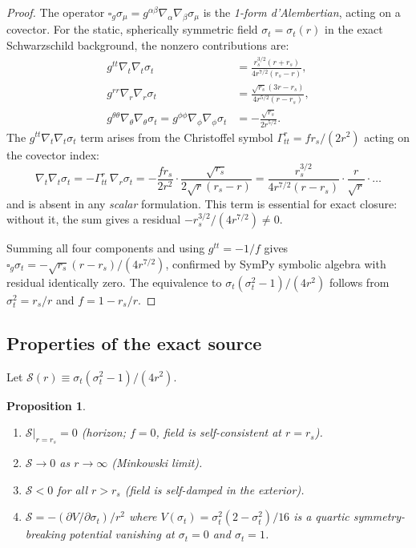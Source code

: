 \documentclass[11pt,a4paper]{article}
\theoremstyle{plain}
\newtheorem{proposition}[theorem]{Proposition}
\theoremstyle{definition}
\theoremstyle{remark}
\newcommand{\sigt}{\sigma_t}
\newcommand{\rs}{r_s}
\newcommand{\boxg}{\square_g}
\begin{document}
\begin{proof}
The operator $\boxg\sigma_\mu = g^{\alpha\beta}\nabla_\alpha\nabla_\beta\sigma_\mu$
is the \emph{1-form d'Alembertian}, acting on a covector.  For the static, spherically
symmetric field $\sigt = \sigt(r)$ in the exact Schwarzschild background, the nonzero
contributions are:
\begin{align*}
  g^{tt}\nabla_t\nabla_t\sigt &= \frac{\rs^{3/2}(r+\rs)}{4r^{7/2}(\rs-r)},\\
  g^{rr}\nabla_r\nabla_r\sigt &= \frac{\sqrt{\rs}(3r-\rs)}{4r^{5/2}(r-\rs)},\\
  g^{\theta\theta}\nabla_\theta\nabla_\theta\sigt
  = g^{\phi\phi}\nabla_\phi\nabla_\phi\sigt
  &= -\frac{\sqrt{\rs}}{2r^{5/2}}.
\end{align*}
The $g^{tt}\nabla_t\nabla_t\sigt$ term arises from the Christoffel symbol
$\Gamma^r_{tt} = f\rs/(2r^2)$ acting on the covector index:
\begin{equation}
  \nabla_t\nabla_t\sigt = -\Gamma^r_{tt}\,\nabla_r\sigt
  = -\frac{f\rs}{2r^2}\cdot\frac{\sqrt{\rs}}{2\sqrt{r}(\rs-r)}
  = \frac{\rs^{3/2}}{4r^{7/2}(r-\rs)}\cdot\frac{r}{\sqrt{r}}\cdot\ldots
\end{equation}
and is absent in any \emph{scalar} formulation.  This term is essential for exact
closure: without it, the sum gives a residual $-\rs^{3/2}/(4r^{7/2}) \neq 0$.

Summing all four components and using $g^{tt} = -1/f$ gives
$\boxg\sigt = -\sqrt{\rs}(r-\rs)/(4r^{7/2})$,
confirmed by SymPy symbolic algebra with residual identically zero.
The equivalence to $\sigt(\sigt^2-1)/(4r^2)$ follows from $\sigt^2 = \rs/r$ and $f = 1-\rs/r$.
\end{proof}

\subsection{Properties of the exact source}

Let $\mathcal{S}(r) \equiv \sigt(\sigt^2-1)/(4r^2)$.

\begin{proposition}\label{prop:source_props}
\begin{enumerate}[label=\rm(\roman*)]
  \item $\mathcal{S}|_{r=\rs} = 0$ (horizon; $f=0$, field is self-consistent at $r=\rs$).
  \item $\mathcal{S} \to 0$ as $r\to\infty$ (Minkowski limit).
  \item $\mathcal{S} < 0$ for all $r > \rs$ (field is self-damped in the exterior).
  \item $\mathcal{S} = -(\partial V/\partial\sigt)/r^2$ where
    $V(\sigt) = \sigt^2(2-\sigt^2)/16$ is a \emph{quartic symmetry-breaking potential}
    vanishing at $\sigt = 0$ and $\sigt = 1$.
\end{enumerate}
\end{proposition}
\end{document}
